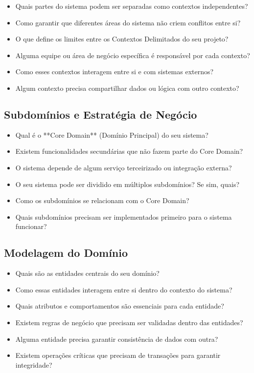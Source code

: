 \begin{itemize}
    \item Quais partes do sistema podem ser separadas como contextos independentes?
    \item Como garantir que diferentes áreas do sistema não criem conflitos entre si?
    \item O que define os limites entre os Contextos Delimitados do seu projeto?
    \item Alguma equipe ou área de negócio específica é responsável por cada contexto?
    \item Como esses contextos interagem entre si e com sistemas externos?
    \item Algum contexto precisa compartilhar dados ou lógica com outro contexto?
\end{itemize}

\subsection{Subdomínios e Estratégia de Negócio}

\begin{itemize}
    \item Qual é o **Core Domain** (Domínio Principal) do seu sistema?
    \item Existem funcionalidades secundárias que não fazem parte do Core Domain?
    \item O sistema depende de algum serviço terceirizado ou integração externa?
    \item O seu sistema pode ser dividido em múltiplos subdomínios? Se sim, quais?
    \item Como os subdomínios se relacionam com o Core Domain?
    \item Quais subdomínios precisam ser implementados primeiro para o sistema funcionar?
\end{itemize}

\subsection{Modelagem do Domínio}

\begin{itemize}
    \item Quais são as entidades centrais do seu domínio?
    \item Como essas entidades interagem entre si dentro do contexto do sistema?
    \item Quais atributos e comportamentos são essenciais para cada entidade?
    \item Existem regras de negócio que precisam ser validadas dentro das entidades?
    \item Alguma entidade precisa garantir consistência de dados com outra?
    \item Existem operações críticas que precisam de transações para garantir integridade?
\end{itemize}

